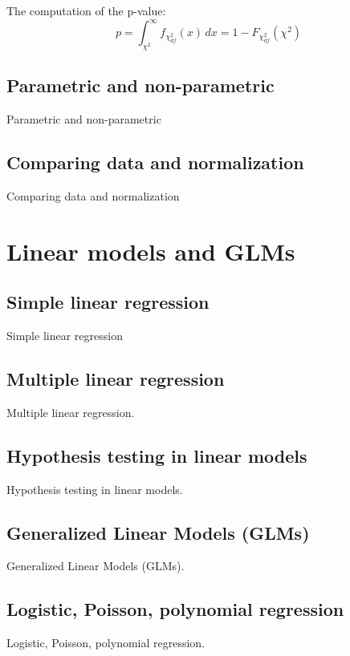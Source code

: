 \documentclass{book}
\begin{document}
The computation of the p-value:
\[
p = \int_{\chi^2}^{\infty} f_{\chi^2_{df}}(x)\,dx = 1 - F_{\chi^2_{df}}(\chi^2)
\]

\newpage

\section{Parametric and non-parametric}

Parametric and non-parametric

\newpage

\section{Comparing data and normalization}
Comparing data and normalization



\chapter{Linear models and GLMs}

\section{Simple linear regression}
Simple linear regression

\newpage

\section{Multiple linear regression}
Multiple linear regression.

\newpage

\section{Hypothesis testing in linear models}
Hypothesis testing in linear models.

\newpage

\section{Generalized Linear Models (GLMs)}
Generalized Linear Models (GLMs).

\newpage

\section{Logistic, Poisson, polynomial regression}
Logistic, Poisson, polynomial regression.
\end{document}
